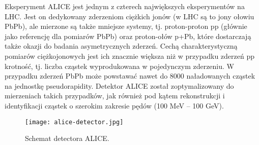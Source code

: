 Eksperyment ALICE jest jednym z czterech największych eksperymentów na LHC. Jest on dedykowany zderzeniom ciężkich jonów (w LHC są to jony ołowiu PbPb), ale mierzone są także mniejsze systemy, tj. proton-proton pp (głównie jako referencję dla pomiarów PbPb) oraz proton-ołów p+Pb, które dostarczają także okazji do badania asymetrycznych zderzeń. Cechą charakterystyczną pomiarów ciężkojonowych jest ich znacznie większa niż w przypadku zderzeń pp krotność, tj. liczba cząstek wyprodukowana w pojedynczym zderzeniu. W przypadku zderzeń PbPb może powstawać nawet do 8000 naładowanych cząstek na jednostkę pseudorapidity. Detektor ALICE został zoptymalizowany do mierzeniach takich przypadków, jak również pod kątem rekonstrukcji i identyfikacji cząstek o szerokim zakresie pędów (100 MeV -- 100 GeV).


\begin{figure}[h]
	\centering
	\texttt{[image: alice-detector.jpg]}
	\caption{Schemat detectora ALICE.}
	\label{fig:alice-detector}
\end{figure}


